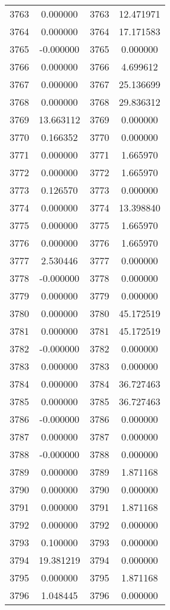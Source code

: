 \documentclass[12pt]{article}
\begin{document}
\begin{longtable}{@{}cccc@{}}
3763 & 0.000000 & 3763 & 12.471971 \\
3764 & 0.000000 & 3764 & 17.171583 \\
3765 & -0.000000 & 3765 & 0.000000 \\
3766 & 0.000000 & 3766 & 4.699612 \\
3767 & 0.000000 & 3767 & 25.136699 \\
3768 & 0.000000 & 3768 & 29.836312 \\
3769 & 13.663112 & 3769 & 0.000000 \\
3770 & 0.166352 & 3770 & 0.000000 \\
3771 & 0.000000 & 3771 & 1.665970 \\
3772 & 0.000000 & 3772 & 1.665970 \\
3773 & 0.126570 & 3773 & 0.000000 \\
3774 & 0.000000 & 3774 & 13.398840 \\
3775 & 0.000000 & 3775 & 1.665970 \\
3776 & 0.000000 & 3776 & 1.665970 \\
3777 & 2.530446 & 3777 & 0.000000 \\
3778 & -0.000000 & 3778 & 0.000000 \\
3779 & 0.000000 & 3779 & 0.000000 \\
3780 & 0.000000 & 3780 & 45.172519 \\
3781 & 0.000000 & 3781 & 45.172519 \\
3782 & -0.000000 & 3782 & 0.000000 \\
3783 & 0.000000 & 3783 & 0.000000 \\
3784 & 0.000000 & 3784 & 36.727463 \\
3785 & 0.000000 & 3785 & 36.727463 \\
3786 & -0.000000 & 3786 & 0.000000 \\
3787 & 0.000000 & 3787 & 0.000000 \\
3788 & -0.000000 & 3788 & 0.000000 \\
3789 & 0.000000 & 3789 & 1.871168 \\
3790 & 0.000000 & 3790 & 0.000000 \\
3791 & 0.000000 & 3791 & 1.871168 \\
3792 & 0.000000 & 3792 & 0.000000 \\
3793 & 0.100000 & 3793 & 0.000000 \\
3794 & 19.381219 & 3794 & 0.000000 \\
3795 & 0.000000 & 3795 & 1.871168 \\
3796 & 1.048445 & 3796 & 0.000000 \\

\end{longtable}
\end{document}
